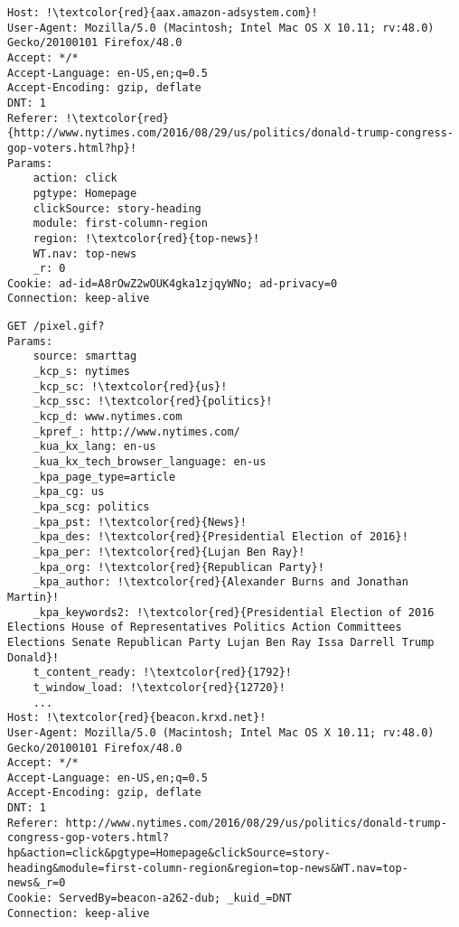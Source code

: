 \begin{lstlisting}[frame=single, breaklines=true, keepspaces=true, basicstyle=\tiny, escapechar=!]
Host: !\textcolor{red}{aax.amazon-adsystem.com}! 
User-Agent: Mozilla/5.0 (Macintosh; Intel Mac OS X 10.11; rv:48.0) 
Gecko/20100101 Firefox/48.0
Accept: */*
Accept-Language: en-US,en;q=0.5
Accept-Encoding: gzip, deflate
DNT: 1
Referer: !\textcolor{red}{http://www.nytimes.com/2016/08/29/us/politics/donald-trump-congress-gop-voters.html?hp}!
Params: 
	action: click
	pgtype: Homepage
	clickSource: story-heading
	module: first-column-region
	region: !\textcolor{red}{top-news}!
	WT.nav: top-news
	_r: 0
Cookie: ad-id=A8rOwZ2wOUK4gka1zjqyWNo; ad-privacy=0
Connection: keep-alive
\end{lstlisting}

\begin{lstlisting}[frame=single, breaklines=true, keepspaces=true, basicstyle=\tiny, escapechar=!]
GET /pixel.gif?
Params:
	source: smarttag
	_kcp_s: nytimes
	_kcp_sc: !\textcolor{red}{us}!
	_kcp_ssc: !\textcolor{red}{politics}!
	_kcp_d: www.nytimes.com
	_kpref_: http://www.nytimes.com/
	_kua_kx_lang: en-us
	_kua_kx_tech_browser_language: en-us
	_kpa_page_type=article
	_kpa_cg: us
	_kpa_scg: politics
	_kpa_pst: !\textcolor{red}{News}!
	_kpa_des: !\textcolor{red}{Presidential Election of 2016}!
	_kpa_per: !\textcolor{red}{Lujan Ben Ray}!
	_kpa_org: !\textcolor{red}{Republican Party}!
	_kpa_author: !\textcolor{red}{Alexander Burns and Jonathan Martin}!
	_kpa_keywords2: !\textcolor{red}{Presidential Election of 2016 Elections House of Representatives Politics Action Committees Elections Senate Republican Party Lujan Ben Ray Issa Darrell Trump Donald}!
	t_content_ready: !\textcolor{red}{1792}!
	t_window_load: !\textcolor{red}{12720}!
	... 	
Host: !\textcolor{red}{beacon.krxd.net}!
User-Agent: Mozilla/5.0 (Macintosh; Intel Mac OS X 10.11; rv:48.0) Gecko/20100101 Firefox/48.0
Accept: */*
Accept-Language: en-US,en;q=0.5
Accept-Encoding: gzip, deflate
DNT: 1
Referer: http://www.nytimes.com/2016/08/29/us/politics/donald-trump-congress-gop-voters.html?hp&action=click&pgtype=Homepage&clickSource=story-heading&module=first-column-region&region=top-news&WT.nav=top-news&_r=0
Cookie: ServedBy=beacon-a262-dub; _kuid_=DNT
Connection: keep-alive
\end{lstlisting}

